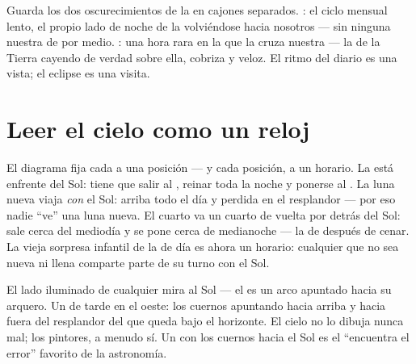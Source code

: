\begin{example}\label{ex:g7:moon-phases:eclipsevs}
Guarda los dos oscurecimientos de la  en cajones separados.
\emph{}: el ciclo mensual lento, el propio lado de noche de la
 volviéndose hacia nosotros --- sin ninguna  nuestra
de por medio. \emph{}: una hora rara en la que la
 cruza nuestra  --- la  de la Tierra
cayendo de verdad sobre ella, cobriza y veloz. El ritmo del diario es
una vista; el eclipse es una visita.
\end{example}

\section{Leer el cielo como un reloj}

\begin{example}\label{ex:g7:moon-phases:hours}
El diagrama fija cada  a una posición --- y cada posición, a un
horario. La  está enfrente del Sol: tiene que salir al
, reinar toda la noche y ponerse al . La luna
nueva viaja \emph{con} el Sol: arriba todo el día y perdida en el
resplandor --- por eso nadie ``ve'' una luna nueva. El cuarto
 va un cuarto de vuelta por detrás del Sol: sale cerca del
mediodía y se pone cerca de medianoche --- la  de después de
cenar. La vieja sorpresa infantil de la  de día es ahora un
horario: cualquier  que no sea nueva ni llena comparte parte de
su turno con el Sol.
\end{example}

\begin{example}\label{ex:g7:moon-phases:points}
El lado iluminado de cualquier  mira al Sol --- el
 es un arco apuntado hacia su arquero. Un  de
tarde en el oeste: los cuernos apuntando hacia arriba y hacia fuera
del resplandor del  que queda bajo el horizonte. El cielo no
lo dibuja nunca mal; los pintores, a menudo sí. Un  con
los cuernos hacia el Sol es el ``encuentra el error'' favorito de la
astronomía.
\end{example}

